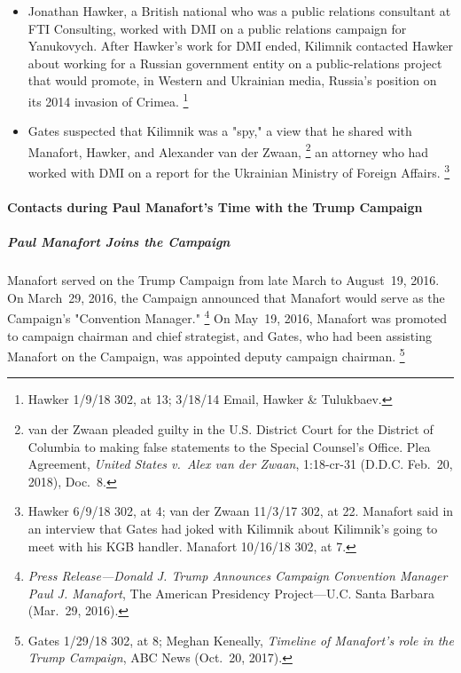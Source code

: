 \begin{itemize}
    \item Jonathan Hawker, a British national who was a public relations consultant at FTI Consulting, worked with DMI on a public relations campaign for Yanukovych.
    After Hawker's work for DMI ended, Kilimnik contacted Hawker about working for a Russian government entity on a public-relations project that would promote, in Western and Ukrainian media, Russia's position on its 2014 invasion of Crimea.%
\footnote{Hawker 1/9/18 302, at 13;
3/18/14 Email, Hawker \& Tulukbaev.}

    \item Gates suspected that Kilimnik was a "spy," a view that he shared with Manafort, Hawker, and Alexander van der Zwaan,%
\footnote{van der Zwaan pleaded guilty in the U.S. District Court for the District of Columbia to making false statements to the Special Counsel's Office.
Plea Agreement, \textit{United States v.\ Alex van der Zwaan}, 1:18-cr-31 (D.D.C. Feb.~20, 2018), Doc.~8.}
    an attorney who had worked with DMI on a report for the Ukrainian Ministry of Foreign Affairs.%
\footnote{Hawker 6/9/18 302, at 4;
van der Zwaan 11/3/17 302, at 22.
Manafort said in an interview that Gates had joked with Kilimnik about Kilimnik's going to meet with his KGB handler.
Manafort 10/16/18 302, at 7.}
\end{itemize}


\paragraph{Contacts during Paul Manafort's Time with the Trump Campaign}

\subparagraph{Paul Manafort Joins the Campaign}

Manafort served on the Trump Campaign from late March to August~19, 2016.
On March~29, 2016, the Campaign announced that Manafort would serve as the Campaign's "Convention Manager."%
\footnote{\textit{Press Release---Donald J. Trump Announces Campaign Convention Manager Paul J. Manafort}, The American Presidency Project---U.C. Santa Barbara (Mar.~29, 2016).}
On May~19, 2016, Manafort was promoted to campaign chairman and chief strategist, and Gates, who had been assisting Manafort on the Campaign, was appointed deputy campaign chairman.%
\footnote{Gates 1/29/18 302, at 8; Meghan Keneally, \textit{Timeline of Manafort's role in the Trump Campaign}, ABC News (Oct.~20, 2017).}

